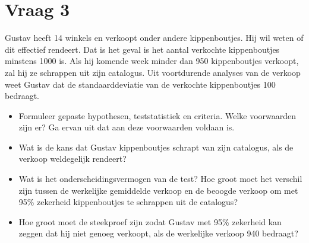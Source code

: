 \documentclass[kulak]{kulakarticle} %
\begin{document}
\newpage

\section*{Vraag 3}
Gustav heeft 14 winkels en verkoopt onder andere kippenboutjes. Hij wil weten of dit effectief rendeert. Dat is het geval is het aantal verkochte kippenboutjes minstens 1000 is. Als hij komende week minder dan 950 kippenboutjes verkoopt, zal hij ze schrappen uit zijn catalogus. Uit voortdurende analyses van de verkoop weet Gustav dat de standaarddeviatie van de verkochte kippenboutjes 100 bedraagt.

\begin{itemize}
	\item Formuleer gepaste hypothesen, teststatistiek en criteria. Welke voorwaarden zijn er? Ga ervan uit dat aan deze voorwaarden voldaan is.
	\item Wat is de kans dat Gustav kippenboutjes schrapt van zijn catalogus, als de verkoop weldegelijk rendeert?
	\item Wat is het onderscheidingsvermogen van de test? Hoe groot moet het verschil zijn tussen de werkelijke gemiddelde verkoop en de beoogde verkoop om met 95\% zekerheid kippenboutjes te schrappen uit de catalogus?
	\item Hoe groot moet de steekproef zijn zodat Gustav met 95\% zekerheid kan zeggen dat hij niet genoeg verkoopt, als de werkelijke verkoop 940 bedraagt?
\end{itemize}
\end{document}
